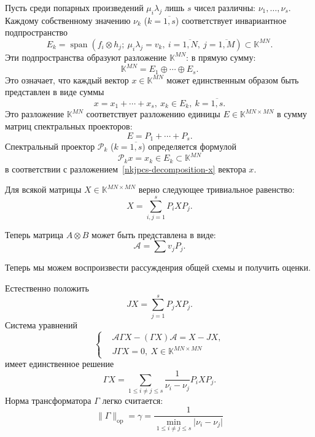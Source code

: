 \documentclass[12pt]{article}
\begin{document}
Пусть среди попарных произведений \( \mu_i \lambda_j \)
    лишь \( s \) чисел различны: \( \nu_1, \ldots, \nu_s \).
Каждому собственному значению \( \nu_k \) (\( k{=}\overline{1,s} \)) соответствует
    инвариантное подпространство
    \[ E_k = \operatorname{span}(f_i\otimes h_j;\ \mu_i\lambda_j = v_k,\ i{=}\overline{1,N},\ j{=}\overline{1,M}) \subset \mathbb{K}^{MN}. \]
Эти подпространства образуют разложение \( \mathbb{K}^{MN} \):
    в прямую сумму:
    \[ \mathbb{K}^{MN} = E_1 \oplus \cdots \oplus E_s. \]
Это означает, что каждый вектор \( x\in\mathbb{K}^{MN} \) может единственным образом
    быть представлен в виде суммы
    \begin{equation}\label{nkjpcs-decomposition-x}
        x = x_1 + \cdots + x_s,\ x_k\in E_k,\ k=\overline{1,s}.
    \end{equation}
Это разложение \( \mathbb{K}^{MN} \)
    соответствует разложению единицы \( E\in \mathbb{K}^{MN{\times}MN} \)
    в сумму матриц спектральных проекторов:
    \[
        E = P_1 + \cdots + P_s.
    \]
Спектральный проектор \( \mathcal{P}_k \) (\(k{=}\overline{1,s}\)) определяется формулой
    \[
        \mathcal{P}_k x = x_k \in E_k\subset \mathbb{K}^{MN}
    \]
    в соответствии с разложением~\eqref{nkjpcs-decomposition-x} вектора \( x \).

Для всякой матрицы \( X\in \mathbb{K}^{MN{\times}MN} \)
    верно следующее тривиальное равенство:
    \[
        X = \sum_{i,j=1}^s P_i X P_j.
    \]

Теперь матрица \( A\otimes B \) может быть представлена в виде:
    \[
        \mathcal{A} = \sum v_j P_j.
    \]

Теперь мы можем воспроизвести рассужденрия общей схемы и получить оценки.

Естественно положить
    \[
        JX = \sum_{j=1}^s P_j X P_j.
    \]
Система уравнений
    \[\left\{\begin{aligned}
        & \mathcal{A}\Gamma X - (\Gamma X) \mathcal{A} = X - JX, \\
        & J\Gamma X = 0,\ X\in \mathbb{K}^{MN{\times}MN}
    \end{aligned}\right.\]
    имеет единственное решение
    \[
        \Gamma X = \sum_{1\leq i{\neq}j \leq s} \frac{1}{\nu_i-\nu_j} P_i X P_j.
    \]
    Норма трансформатора \( \Gamma \) легко считается:
    \[
        \|\Gamma\|_{\mathrm{op}} = \gamma = \frac{1}{\min_{1\leq i{\neq}j\leq s}\lvert\nu_i - \nu_j\rvert}
    \]
\end{document}
